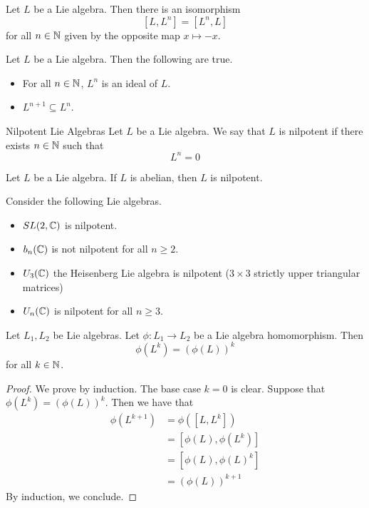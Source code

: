 \documentclass[a4paper]{article}
\begin{document}
\begin{lmm}{}{} Let $L$ be a Lie algebra. Then there is an isomorphism $$[L,L^n]=[L^n,L]$$ for all $n\in\mathbb{N}$ given by the opposite map $x\mapsto -x$. 
\end{lmm}

\begin{lmm}{}{} Let $L$ be a Lie algebra. Then the following are true. 
\begin{itemize}
\item For all $n\in\mathbb{N}$, $L^n$ is an ideal of $L$. 
\item $L^{n+1}\subseteq L^n$. 
\end{itemize}
\end{lmm}

\begin{defn}{Nilpotent Lie Algebras}{} Let $L$ be a Lie algebra. We say that $L$ is nilpotent if there exists $n\in\mathbb{N}$ such that $$L^n=0$$
\end{defn}

\begin{lmm}{}{} Let $L$ be a Lie algebra. If $L$ is abelian, then $L$ is nilpotent. 
\end{lmm}

\begin{eg}{}{} Consider the following Lie algebras. 
\begin{itemize}
\item $SL(2,\mathbb{C})$ is nilpotent. 
\item $b_n(\mathbb{C})$ is not nilpotent for all $n\geq 2$. 
\item $U_3(\mathbb{C})$ the Heisenberg Lie algebra is nilpotent ($3\times 3$ strictly upper triangular matrices)
\item $U_n(\mathbb{C})$ is nilpotent for all $n\geq 3$. 
\end{itemize}
\end{eg}

\begin{lmm}{}{} Let $L_1,L_2$ be Lie algebras. Let $\phi:L_1\to L_2$ be a Lie algebra homomorphism. Then $$\phi(L^k)=(\phi(L))^k$$ for all $k\in\mathbb{N}$. \tcbline
\begin{proof}
We prove by induction. The base case $k=0$ is clear. Suppose that $\phi(L^k)=(\phi(L))^k$. Then we have that 
\begin{align*}
\phi(L^{k+1})&=\phi([L,L^k])\\
&=[\phi(L),\phi(L^k)]\\
&=[\phi(L),\phi(L)^k]\\
&=(\phi(L))^{k+1}
\end{align*}
By induction, we conclude. 
\end{proof}
\end{lmm}
\end{document}
